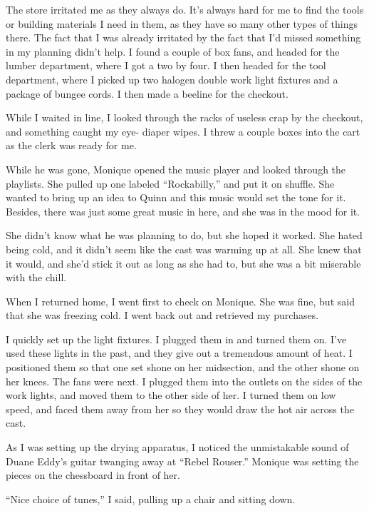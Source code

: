 The store irritated me as they always do. It's always hard for me to find the tools or
building materials I need in them, as they have so many other types of things there. The fact
that I was already irritated by the fact that I'd missed something in my planning didn't help. I
found a couple of box fans, and headed for the lumber department, where I got a two by four. I
then headed for the tool department, where I picked up two halogen double work light fixtures
and a package of bungee cords. I then made a beeline for the checkout.

While I waited in line, I looked through the racks of useless crap by the checkout, and
something caught my eye- diaper wipes. I threw a couple boxes into the cart as the clerk was
ready for me.

While he was gone, Monique opened the music player and looked through the playlists. She
pulled up one labeled ``Rockabilly,'' and put it on shuffle. She wanted to bring up an idea to
Quinn and this music would set the tone for it. Besides, there was just some great music in
here, and she was in the mood for it.

\begin{thought}
She didn't know what he was planning to do, but she hoped it worked. She hated being cold,
and it didn't seem like the cast was warming up at all. She knew that it would, and she'd stick
it out as long as she had to, but she was a bit miserable with the chill.
\end{thought}

When I returned home, I went first to check on Monique. She was fine, but said that she was
freezing cold. I went back out and retrieved my purchases.

I quickly set up the light fixtures. I plugged them in and turned them on. I've used these
lights in the past, and they give out a tremendous amount of heat. I positioned them so that one
set shone on her midsection, and the other shone on her knees. The fans were next. I plugged
them into the outlets on the sides of the work lights, and moved them to the other side of her.
I turned them on low speed, and faced them away from her so they would draw the hot air across
the cast.

As I was setting up the drying apparatus, I noticed the unmistakable sound of Duane Eddy's
guitar twanging away at ``Rebel Rouser.'' Monique was setting the pieces on the chessboard in
front of her.

``Nice choice of tunes,'' I said, pulling up a chair and sitting down.

